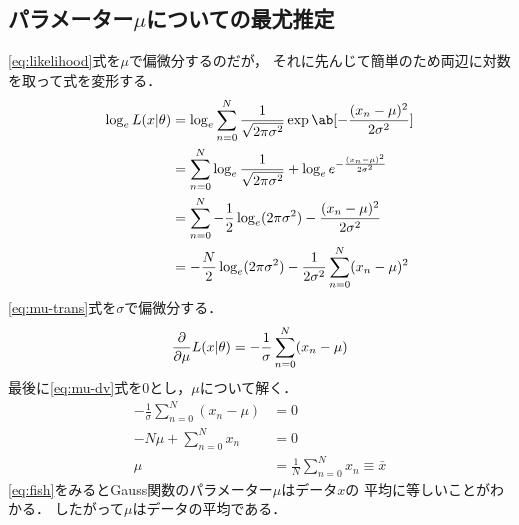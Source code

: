 \documentclass{jlreq}
\begin{document}
		\subsection{パラメーター\(\mu\)についての最尤推定}
			\eqref{eq:likelihood}式を\(\mu\)で偏微分するのだが，
			それに先んじて簡単のため両辺に対数を取って式を変形する．
				\begin{align}
					\log_e L(x|\theta) &= \log_e \sum_{n=0}^N 
						\frac{1}{\sqrt{2\pi\sigma^2}}
						\exp\ab[{-\frac{(x_n-\mu)^2}{2\sigma^2}}]\\
					&= \sum_{n=0}^N\log_e\frac{1}{\sqrt{2\pi\sigma^2}} +
						\log_e e^{-\frac{(x_n-\mu)^2}{2\sigma^2}}\\
					&= \sum_{n=0}^N -\frac{1}{2}\log_e(2\pi\sigma^2) -
					\frac{(x_n-\mu)^2}{2\sigma^2}\\
					&= -\frac{N}{2}\log_e(2\pi\sigma^2) -
						\frac{1}{2\sigma^2}\sum_{n=0}^N(x_n-\mu)^2\label{eq:mu-trans}
				\end{align}
			\eqref{eq:mu-trans}式を\(\sigma\)で偏微分する．
				\begin{equation}
					\pdv{}{\mu}L(x|\theta) =
						-\frac{1}{\sigma}\sum_{n=0}^N(x_n-\mu)\label{eq:mu-dv}
				\end{equation}
			最後に\eqref{eq:mu-dv}式を0とし，\(\mu\)について解く．
				\begin{align}
					-\frac{1}{\sigma}\sum_{n=0}^N(x_n-\mu) &= 0\\
					-N\mu + \sum_{n=0}^Nx_n &= 0\\
					\mu &= \frac{1}{N}\sum_{n=0}^Nx_n \equiv \bar{x} \label{eq:fish}
				\end{align}
			\eqref{eq:fish}をみるとGauss関数のパラメーター\(\mu\)はデータ\(x\)の
			平均に等しいことがわかる．
			したがって\(\mu\)はデータの平均である．
\end{document}

